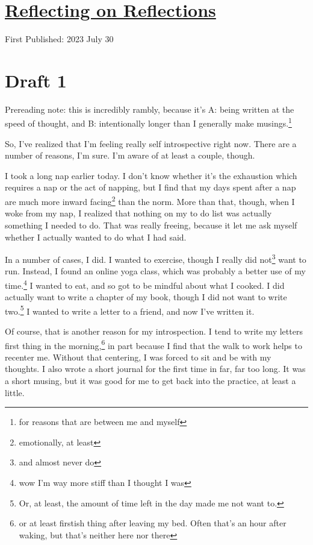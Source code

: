 \documentclass[12pt]{article}[titlepage]
\renewcommand{\,}{\textsuperscript{,}}
\begin{document}
\doublespacing
\section{\href{reflection.html}{Reflecting on Reflections}}
First Published: 2023 July 30


\section{Draft 1}
Prereading note: this is incredibly rambly, because it's A: being written at the speed of thought, and B: intentionally longer than I generally make musings.\footnote{for reasons that are between me and myself}

So, I've realized that I'm feeling really self introspective right now.
There are a number of reasons, I'm sure.
I'm aware of at least a couple, though.

I took a long nap earlier today.
I don't know whether it's the exhaustion which requires a nap or the act of napping, but I find that my days spent after a nap are much more inward facing\footnote{emotionally, at least} than the norm.
More than that, though, when I woke from my nap, I realized that nothing on my to do list was actually something I needed to do.
That was really freeing, because it let me ask myself whether I actually wanted to do what I had said.

In a number of cases, I did.
I wanted to exercise, though I really did not\footnote{and almost never do} want to run.
Instead, I found an online yoga class, which was probably a better use of my time.\footnote{wow I'm way more stiff than I thought I was}
I wanted to eat, and so got to be mindful about what I cooked.
I did actually want to write a chapter of my book, though I did not want to write two.\footnote{Or, at least, the amount of time left in the day made me not want to.}
I wanted to write a letter to a friend, and now I've written it.

Of course, that is another reason for my introspection.
I tend to write my letters first thing in the morning,\footnote{or at least firstish thing after leaving my bed. Often that's an hour after waking, but that's neither here nor there} in part because I find that the walk to work helps to recenter me.
Without that centering, I was forced to sit and be with my thoughts.
I also wrote a short journal for the first time in far, far too long.
It was a short musing, but it was good for me to get back into the practice, at least a little.
\end{document}
